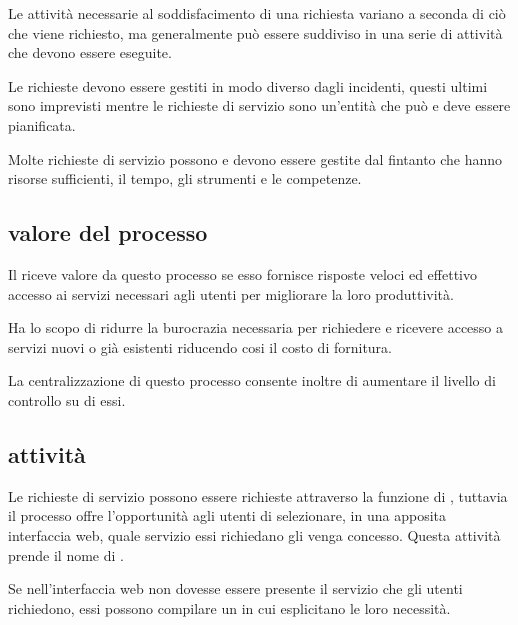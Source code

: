 Le attività necessarie al soddisfacimento di una richiesta variano a seconda di ciò che viene richiesto, ma generalmente può essere suddiviso in una serie di attività che devono essere eseguite.

Le richieste devono essere gestiti in modo diverso dagli incidenti, questi ultimi sono imprevisti mentre le richieste di servizio sono un'entità che può e deve essere pianificata.

Molte richieste di servizio possono e devono essere gestite dal  fintanto che hanno risorse sufficienti, il tempo, gli strumenti e le competenze.

\subsection[Valore del processo]{valore del processo}
\label{prc-request-value}
Il  riceve valore da questo processo se esso fornisce risposte veloci ed effettivo accesso ai servizi necessari agli utenti per migliorare la loro produttività.

Ha lo scopo di ridurre la burocrazia necessaria per richiedere e ricevere accesso a servizi nuovi o già esistenti riducendo cosi il costo di fornitura.

La centralizzazione di questo processo consente inoltre di aumentare il livello di controllo su di essi.

\subsection[Attività]{attività}
\label{prc-request-activities}
Le richieste di servizio possono essere richieste attraverso la funzione di , tuttavia il processo offre l'opportunità agli utenti di selezionare, in una apposita interfaccia web, quale servizio essi richiedano gli venga concesso. Questa attività prende il nome di .

Se nell'interfaccia web non dovesse essere presente il servizio che gli utenti richiedono, essi possono compilare un  in cui esplicitano le loro necessità.

